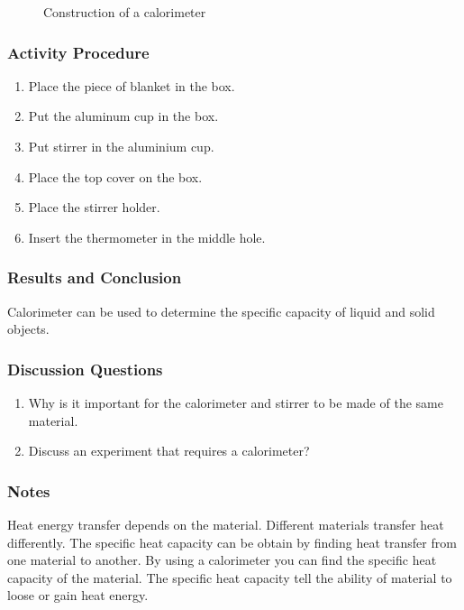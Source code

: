 \begin{figure}
\begin{center}
\def\svgwidth{350pt}

\caption{Construction of a calorimeter}
\label{fig:calorimeter}
\end{center}
\end{figure}

\subsubsection*{Activity Procedure}
\begin{enumerate}
\item{Place the piece of blanket in the box.}
\item{Put the aluminum cup in the box.}
\item{Put stirrer in the aluminium cup.}
\item{Place the top cover on the box.}
\item{Place the stirrer holder.}
\item{Insert the thermometer in the middle hole.}
\end{enumerate}

\subsubsection*{Results and Conclusion}
Calorimeter can be used to determine the specific capacity of liquid and solid objects.

\subsubsection*{Discussion Questions}
\begin{enumerate}
\item{Why is it important for the calorimeter and stirrer to be made of the same material.}
\item{Discuss an experiment that requires a calorimeter?}
\end{enumerate}

\subsubsection*{Notes}
Heat energy transfer depends on the material. Different materials transfer heat differently. The specific heat capacity can be obtain by finding heat transfer from one material to another. By using a calorimeter 
you can find the specific heat capacity of the material. The specific heat capacity tell the ability of material to loose or gain heat energy.

